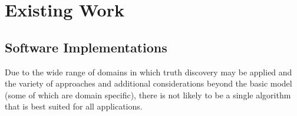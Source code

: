\documentclass[../main.tex]{subfiles}
\begin{document}







\section{Existing Work}
\subsection{Software Implementations}

Due to the wide range of domains in which truth discovery may be applied and
the variety of approaches and additional considerations beyond the basic model
(some of which are domain specific), there is not likely to be a single
algorithm that is best suited for all applications.
\end{document}

